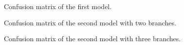 \documentclass[twocolumn]{article}
\begin{document}
	\begin{figure}[htb]
		\centering
		\caption{Confusion matrix of the first model.}
		\label{fig:model1_conf}
	\end{figure}
	\begin{figure}[htb]
		\centering
		\caption{Confusion matrix of the second model with two branches.}
		\label{fig:model2_1_conf}
	\end{figure}
	\begin{figure}[htb]
		\centering
		\caption{Confusion matrix of the second model with three branches.}
		\label{fig:model2_2_conf}
	\end{figure}
\end{document}
